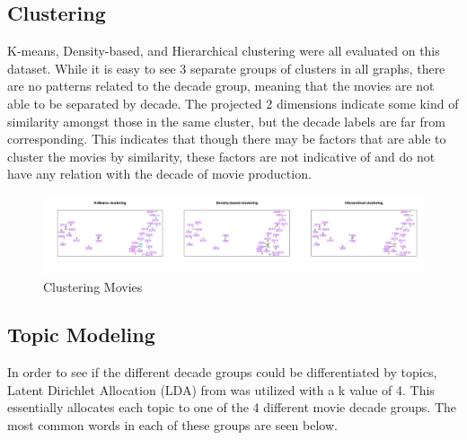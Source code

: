 \documentclass[
  authoryear,
  preprint]{elsarticle}
\begin{document}
\subsection{Clustering}\label{clustering}

K-means, Density-based, and Hierarchical clustering were all evaluated
on this dataset. While it is easy to see 3 separate groups of clusters
in all graphs, there are no patterns related to the decade group,
meaning that the movies are not able to be separated by decade. The
projected 2 dimensions indicate some kind of similarity amongst those in
the same cluster, but the decade labels are far from corresponding. This
indicates that though there may be factors that are able to cluster the
movies by similarity, these factors are not indicative of and do not
have any relation with the decade of movie production.

\begin{figure}[H]

{\centering \includegraphics{images/hier-imageonline.co-merged.png}

}

\caption{Clustering Movies}

\end{figure}%

\subsection{Topic Modeling}\label{topic-modeling}

In order to see if the different decade groups could be differentiated
by topics, Latent Dirichlet Allocation (LDA) from \citet{ldapaper} was
utilized with a k value of 4. This essentially allocates each topic to
one of the 4 different movie decade groups. The most common words in
each of these groups are seen below.
\end{document}
